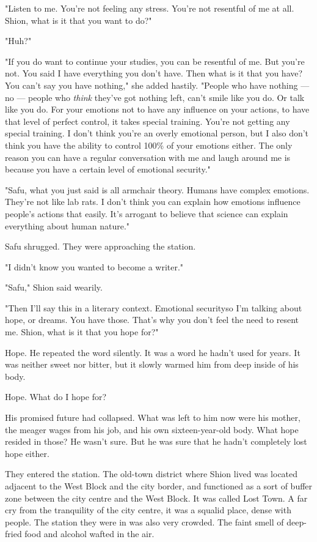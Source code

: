 "Listen to me. You're not feeling any stress. You're not resentful of me
at all. Shion, what is it that you want to do?"

"Huh?"

"If you do want to continue your studies, you can be resentful of me.
But you're not. You said I have everything you don't have. Then what is
it that you have? You can't say you have nothing," she added hastily.
"People who have nothing --- no --- people who \emph{think} they've got nothing
left, can't smile like you do. Or talk like you do. For your emotions
not to have any influence on your actions, to have that level of perfect
control, it takes special training. You're not getting any special
training. I don't think you're an overly emotional person, but I also
don't think you have the ability to control 100\% of your emotions
either. The only reason you can have a regular conversation with me and
laugh around me is because you have a certain level of emotional
security."

"Safu, what you just said is all armchair theory. Humans have complex
emotions. They're not like lab rats. I don't think you can explain how
emotions influence people's actions that easily. It's arrogant to
believe that science can explain everything about human nature."

Safu shrugged. They were approaching the station.

"I didn't know you wanted to become a writer."

"Safu," Shion said wearily.

"Then I'll say this in a literary context. Emotional security\el so I'm
talking about hope, or dreams. You have those. That's why you don't feel
the need to resent me. Shion, what is it that you hope for?"

\mybreak

Hope. He repeated the word silently. It was a word he hadn't used for
years. It was neither sweet nor bitter, but it slowly warmed him from
deep inside of his body.

Hope. What do I hope for?

His promised future had collapsed. What was left to him now were his
mother, the meager wages from his job, and his own sixteen-year-old
body. What hope resided in those? He wasn't sure. But he was sure that
he hadn't completely lost hope either.

They entered the station. The old-town district where Shion lived was
located adjacent to the West Block and the city border, and functioned
as a sort of buffer zone between the city centre and the West Block. It
was called Lost Town. A far cry from the tranquility of the city centre,
it was a squalid place, dense with people. The station they were in was
also very crowded. The faint smell of deep-fried food and alcohol wafted
in the air.

